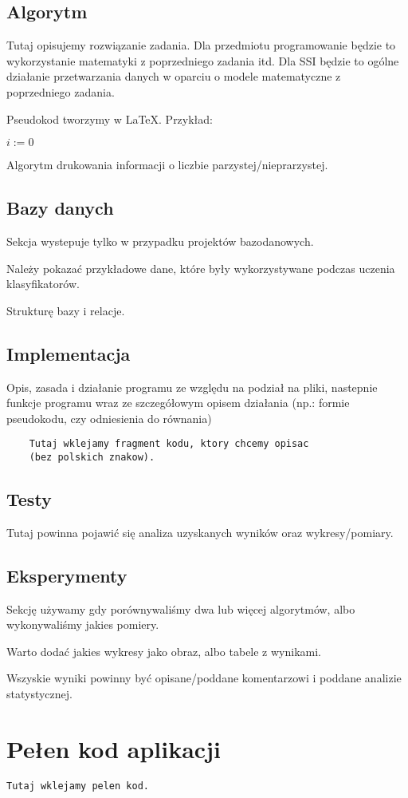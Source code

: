 \documentclass[12pt,a4paper]{article}
\begin{document}
	
	
	\subsection*{Algorytm}
	Tutaj opisujemy rozwiązanie zadania. Dla przedmiotu programowanie będzie to wykorzystanie matematyki z poprzedniego zadania itd. Dla SSI będzie to ogólne działanie przetwarzania danych w oparciu o modele matematyczne z poprzedniego zadania. 
	
	
	Pseudokod tworzymy w \LaTeX. Przykład:\\
	\begin{algorithm}[H]
		$i:=0$\;
		\caption{Algorytm drukowania informacji o liczbie parzystej/nieprarzystej.}
	\end{algorithm}

	\subsection*{Bazy danych}
	Sekcja wystepuje tylko w przypadku projektów bazodanowych.
	
	Należy pokazać przykładowe dane, które były wykorzystywane podczas uczenia klasyfikatorów.
	
	Strukturę bazy i relacje.
	\subsection*{Implementacja}
	Opis, zasada i działanie programu ze względu na podział na pliki, nastepnie	funkcje programu wraz ze szczegółowym opisem działania (np.: formie pseudokodu, czy odniesienia do równania)
	\begin{lstlisting}
	Tutaj wklejamy fragment kodu, ktory chcemy opisac 
	(bez polskich znakow).
	\end{lstlisting}
	\subsection*{Testy}
	Tutaj powinna pojawić się analiza uzyskanych wyników oraz wykresy/pomiary.
	
	\subsection*{Eksperymenty}
	Sekcję używamy gdy porównywaliśmy dwa lub więcej algorytmów, albo wykonywaliśmy jakies pomiery.
	
	Warto dodać jakies wykresy jako obraz, albo tabele z wynikami. 
	
	Wszyskie wyniki powinny być opisane/poddane komentarzowi i poddane analizie statystycznej.
	\newpage
	\section*{Pełen kod aplikacji}
\begin{lstlisting}
Tutaj wklejamy pelen kod. 
\end{lstlisting}
\end{document}
